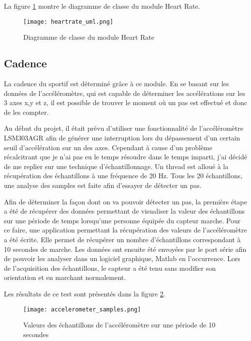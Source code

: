 La figure \ref{fig:heartrate_uml} montre le diagramme de classe du module Heart Rate.

\begin{figure}[htb]
\centering 
\texttt{[image: heartrate\_uml.png]} 
\caption{Diagramme de classe du module Heart Rate}
\label{fig:heartrate_uml}
\end{figure}

\subsection{Cadence}

La cadence du sportif est déterminé grâce à ce module. En se basant sur les données de l'accéléromètre, qui est capable de déterminer les accélérations sur les 3 axes x,y et z, il est possible de trouver le moment où un pas est effectué et donc de les compter. 

Au début du projet, il était prévu d'utiliser une fonctionnalité de l'accéléromètre LSM303AGR afin de générer une interruption lors du dépassement d'un certain seuil d'accélération sur un des axes. Cependant à cause d'un problème récalcitrant que je n'ai pas eu le temps résoudre dans le temps imparti, j'ai décidé de me replier sur une technique d'échantillonnage. Un thread est alloué à la récupération des échantillons à une fréquence de 20 Hz. Tous les 20 échantillons, une analyse des samples est faite afin d'essayer de détecter un pas.

Afin de déterminer la façon dont on va pouvoir détecter un pas, la première étape a été de récupérer des données permettant de visualiser la valeur des échantillons sur une période de temps lorsqu'une personne équipée du capteur marche. Pour ce faire, une application permettant la récupération des valeurs de l'accéléromètre a été écrite. Elle permet de récupérer un nombre d'échantillons correspondant à 10 secondes de marche. Les données ont ensuite été envoyées par le port série afin de pouvoir les analyser dans un logiciel graphique, Matlab en l'occurrence. Lors de l'acquisition des échantillons, le capteur a été tenu sans modifier son orientation et en marchant normalement.

Les résultats de ce test sont présentés dans la figure \ref{fig:graph_accel}.

\begin{figure}[htb]
\centering 
\texttt{[image: accelerometer\_samples.png]} 
\caption{Valeurs des échantillons de l'accéléromètre sur une période de 10 secondes}
\label{fig:graph_accel}
\end{figure}


